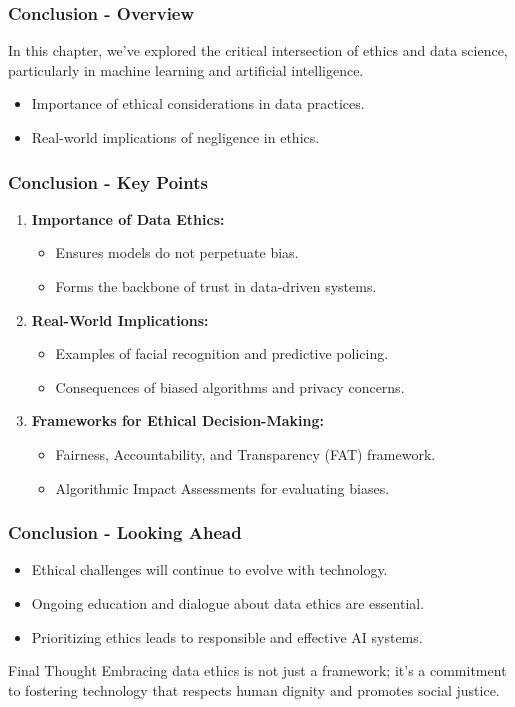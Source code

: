 \documentclass[aspectratio=169]{beamer}
\begin{document}
\begin{frame}[fragile]
    \frametitle{Conclusion - Overview}
    In this chapter, we've explored the critical intersection of ethics and data science, particularly in machine learning and artificial intelligence. 
    \begin{itemize}
        \item Importance of ethical considerations in data practices.
        \item Real-world implications of negligence in ethics.
    \end{itemize}
\end{frame}

\begin{frame}[fragile]
    \frametitle{Conclusion - Key Points}
    \begin{enumerate}
        \item \textbf{Importance of Data Ethics:}
            \begin{itemize}
                \item Ensures models do not perpetuate bias.
                \item Forms the backbone of trust in data-driven systems.
            \end{itemize}
        \item \textbf{Real-World Implications:}
            \begin{itemize}
                \item Examples of facial recognition and predictive policing.
                \item Consequences of biased algorithms and privacy concerns.
            \end{itemize}
        \item \textbf{Frameworks for Ethical Decision-Making:}
            \begin{itemize}
                \item Fairness, Accountability, and Transparency (FAT) framework.
                \item Algorithmic Impact Assessments for evaluating biases.
            \end{itemize}
    \end{enumerate}
\end{frame}

\begin{frame}[fragile]
    \frametitle{Conclusion - Looking Ahead}
    \begin{itemize}
        \item Ethical challenges will continue to evolve with technology.
        \item Ongoing education and dialogue about data ethics are essential.
        \item Prioritizing ethics leads to responsible and effective AI systems.
    \end{itemize}

    \begin{block}{Final Thought}
        Embracing data ethics is not just a framework; it's a commitment to fostering technology that respects human dignity and promotes social justice.
    \end{block}
\end{frame}
\end{document}
